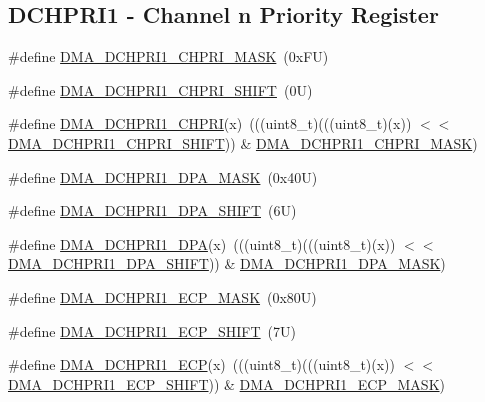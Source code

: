 \subsection*{D\+C\+H\+P\+R\+I1 -\/ Channel n Priority Register}
\begin{DoxyCompactItemize}
\item 
\#define \mbox{\hyperlink{group___d_m_a___register___masks_ga5a655b5899c5da64b36029329ff25fb8}{D\+M\+A\+\_\+\+D\+C\+H\+P\+R\+I1\+\_\+\+C\+H\+P\+R\+I\+\_\+\+M\+A\+SK}}~(0x\+F\+U)
\item 
\#define \mbox{\hyperlink{group___d_m_a___register___masks_ga3270315532805b61a878d4ab0e96045f}{D\+M\+A\+\_\+\+D\+C\+H\+P\+R\+I1\+\_\+\+C\+H\+P\+R\+I\+\_\+\+S\+H\+I\+FT}}~(0\+U)
\item 
\#define \mbox{\hyperlink{group___d_m_a___register___masks_gaddf04b7fae51a71b6e019f4b9394d156}{D\+M\+A\+\_\+\+D\+C\+H\+P\+R\+I1\+\_\+\+C\+H\+P\+RI}}(x)~(((uint8\+\_\+t)(((uint8\+\_\+t)(x)) $<$$<$ \mbox{\hyperlink{group___d_m_a___register___masks_ga3270315532805b61a878d4ab0e96045f}{D\+M\+A\+\_\+\+D\+C\+H\+P\+R\+I1\+\_\+\+C\+H\+P\+R\+I\+\_\+\+S\+H\+I\+FT}})) \& \mbox{\hyperlink{group___d_m_a___register___masks_ga5a655b5899c5da64b36029329ff25fb8}{D\+M\+A\+\_\+\+D\+C\+H\+P\+R\+I1\+\_\+\+C\+H\+P\+R\+I\+\_\+\+M\+A\+SK}})
\item 
\#define \mbox{\hyperlink{group___d_m_a___register___masks_ga6a463897cc661b31a11d35fa0f31671a}{D\+M\+A\+\_\+\+D\+C\+H\+P\+R\+I1\+\_\+\+D\+P\+A\+\_\+\+M\+A\+SK}}~(0x40\+U)
\item 
\#define \mbox{\hyperlink{group___d_m_a___register___masks_ga88db9a46c344a07de9dc96e527e97e4f}{D\+M\+A\+\_\+\+D\+C\+H\+P\+R\+I1\+\_\+\+D\+P\+A\+\_\+\+S\+H\+I\+FT}}~(6\+U)
\item 
\#define \mbox{\hyperlink{group___d_m_a___register___masks_ga25f34f2a39b6899ae03366a798e3bad8}{D\+M\+A\+\_\+\+D\+C\+H\+P\+R\+I1\+\_\+\+D\+PA}}(x)~(((uint8\+\_\+t)(((uint8\+\_\+t)(x)) $<$$<$ \mbox{\hyperlink{group___d_m_a___register___masks_ga88db9a46c344a07de9dc96e527e97e4f}{D\+M\+A\+\_\+\+D\+C\+H\+P\+R\+I1\+\_\+\+D\+P\+A\+\_\+\+S\+H\+I\+FT}})) \& \mbox{\hyperlink{group___d_m_a___register___masks_ga6a463897cc661b31a11d35fa0f31671a}{D\+M\+A\+\_\+\+D\+C\+H\+P\+R\+I1\+\_\+\+D\+P\+A\+\_\+\+M\+A\+SK}})
\item 
\#define \mbox{\hyperlink{group___d_m_a___register___masks_ga14d7f4364a392f0b23a4effdf3f04f4a}{D\+M\+A\+\_\+\+D\+C\+H\+P\+R\+I1\+\_\+\+E\+C\+P\+\_\+\+M\+A\+SK}}~(0x80\+U)
\item 
\#define \mbox{\hyperlink{group___d_m_a___register___masks_ga404b79e3e633ecb770dbf283d8b5fccd}{D\+M\+A\+\_\+\+D\+C\+H\+P\+R\+I1\+\_\+\+E\+C\+P\+\_\+\+S\+H\+I\+FT}}~(7\+U)
\item 
\#define \mbox{\hyperlink{group___d_m_a___register___masks_ga7c870d320064c8b7e4e17beab86f6d7c}{D\+M\+A\+\_\+\+D\+C\+H\+P\+R\+I1\+\_\+\+E\+CP}}(x)~(((uint8\+\_\+t)(((uint8\+\_\+t)(x)) $<$$<$ \mbox{\hyperlink{group___d_m_a___register___masks_ga404b79e3e633ecb770dbf283d8b5fccd}{D\+M\+A\+\_\+\+D\+C\+H\+P\+R\+I1\+\_\+\+E\+C\+P\+\_\+\+S\+H\+I\+FT}})) \& \mbox{\hyperlink{group___d_m_a___register___masks_ga14d7f4364a392f0b23a4effdf3f04f4a}{D\+M\+A\+\_\+\+D\+C\+H\+P\+R\+I1\+\_\+\+E\+C\+P\+\_\+\+M\+A\+SK}})
\end{DoxyCompactItemize}
